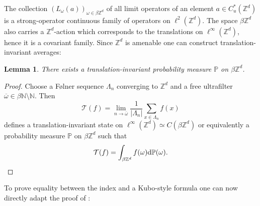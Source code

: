 \documentclass[12pt]{amsart}
\newtheorem{lemma}[theorem]{Lemma}
\newcommand{\NM}{{\mathbb N}}
\newcommand{\ZM}{{\mathbb Z}}
\newcommand{\PM}{{\mathbb P}}
\newcommand{\Tt}{{\mathcal T}}
\newcommand{\difd}{\textup{d}}
\begin{document}
The collection $(L_\omega(a))_{\omega\in \beta\ZM^d}$ of all limit operators of an element $a\in C^*_u(\ZM^d)$ is a strong-operator continuous family of operators on $\ell^2(\ZM^d)$. The space $\beta\ZM^d$ also carries a $\ZM^d$-action which corresponds to the translations on $\ell^\infty(\ZM^d)$, hence it is a covariant family. Since $\ZM^d$ is amenable one can construct translation-invariant averages:
\begin{lemma}
There exists a translation-invariant probability measure $\PM$ on $\beta\ZM^d$.
\end{lemma}
\begin{proof}
Choose a Følner sequence $\Lambda_n$ converging to $\ZM^d$ and a free ultrafilter $\overline{\omega}\in \beta\NM\setminus \NM$. Then
$$\Tt(f) = \lim_{n\to \overline{\omega}} \frac{1}{|\Lambda_n|} \sum_{x\in \Lambda_n} f(x)$$
defines a translation-invariant state on $\ell^\infty(\ZM^d)\simeq C(\beta \ZM^d)$ or equivalently a probability measure $\PM$ on $\beta\ZM^d$ such that
$$\Tt(f)=\int_{\beta\ZM^d} f(\omega) \difd\PM(\omega).$$ 
\end{proof}

To prove equality between the index and a Kubo-style formula one can now directly adapt the proof of \cite[Theorem~6.4.1]{ProdanSchulzBaldes2016}:
\end{document}
